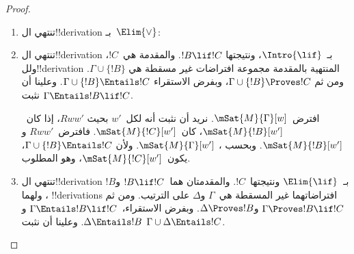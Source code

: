 \documentclass[../../../include/open-logic-section]{subfiles}
\begin{document}
\begin{proof}
\begin{enumerate}
  \item تنتهي ال!!{derivation} بـ~$\Elim{\lor}$:

  \item تنتهي ال!!{derivation} بـ~$\Intro{\lif}$، ونتيجتها
    $!B \lif !C$. والمقدمة هي~$!C$، ولل!!{derivation} المنتهية
    بالمقدمة مجموعة افتراضات غير مسقطة هي
    $\Gamma \cup \{!B\}$. ومن ثم
    $\Gamma \cup \{!B\} \Proves !C$، وبفرض الاستقراء
    $\Gamma \cup \{!B\} \Entails !C$. وعلينا أن نثبت
    $\Gamma \Entails !B \lif !C$.

    افترض~$\mSat{M}{\Gamma}[w]$. نريد أن نثبت أنه لكل~$w'$ بحيث
    $Rww'$، إذا كان~$\mSat{M}{!B}[w']$، كان~$\mSat{M}{!C}[w']$.
    فافترض~$Rww'$ و$\mSat{M}{!B}[w']$. وبحسب
    ،
    $\mSat{M}{\Gamma}[w']$. ولأن
    $\Gamma \cup \{!B\} \Entails !C$، يكون~$\mSat{M}{!C}[w']$،
    وهو المطلوب.

  \item تنتهي ال!!{derivation} بـ~$\Elim{\lif}$ ونتيجتها~$!C$.
    والمقدمتان هما~$!B \lif !C$ و$!B$، ولهما !!{derivation}s
    افتراضاتهما غير المسقطة هي~$\Gamma$ و$\Delta$ على الترتيب. ومن ثم
    $\Gamma \Proves !B \lif !C$ و$\Delta \Proves !B$. وبفرض
    الاستقراء،~$\Gamma \Entails !B \lif !C$ و
    $\Delta \Entails !B$. وعلينا أن نثبت
    $\Gamma \cup \Delta \Entails !C$.


\end{enumerate}
\end{proof}
\end{document}

